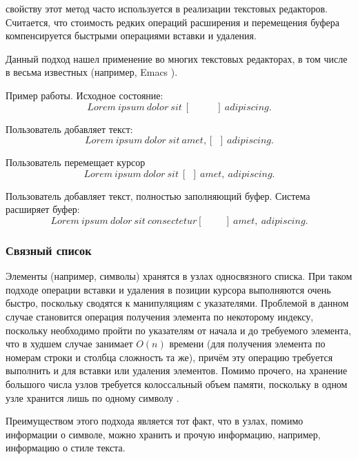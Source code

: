 \documentclass{fefu}
\begin{document}
				свойству этот метод часто используется в реализации текстовых редакторов.
				Считается, что стоимость редких операций расширения и перемещения буфера
				компенсируется быстрыми операциями вставки и удаления.
				\par Данный подход нашел применение во многих текстовых
				редакторах, в том числе в весьма известных (например, Emacs
				\cite{EmacsGapBuffer}).
				\par Пример работы. Исходное состояние:
				$$Lorem~ipsum~dolor~sit~[~~~~~~~~~~~~]~adipiscing.$$
				\par Пользователь добавляет текст:
				$$Lorem~ipsum~dolor~sit~amet,[~~]~adipiscing.$$
				\par Пользователь перемещает курсор
				$$Lorem~ipsum~dolor~sit~[~~]~amet,~adipiscing.$$
				\par Пользователь добавляет текст, полностью заполняющий буфер. Система
				расширяет буфер:
				$$Lorem~ipsum~dolor~sit~consectetur[~~~~~~~~~~]~amet,~adipiscing.$$
			\subsubsection{Связный список}
				\par Элементы (например, символы) хранятся в узлах односвязного списка. При 
				таком подходе операции вставки и удаления в позиции курсора выполняются очень 
				быстро, поскольку сводятся к манипуляциям с указателями. Проблемой в данном 
				случае становится операция получения элемента по некоторому индексу, поскольку 
				необходимо пройти по указателям от начала и до требуемого элемента, что в 
				худшем случае занимает $O(n)$ времени (для получения элемента по номерам строки
				и столбца сложность та же), причём эту операцию требуется выполнить и для 
				вставки или удаления элементов. Помимо прочего, на хранение большого числа 
				узлов требуется колоссальный объем памяти, поскольку в одном узле хранится лишь 
				по одному символу \cite{LinkedListReference}.
				\par Преимуществом этого подхода является тот факт, что в узлах, помимо
				информации о символе, можно хранить и прочую информацию, например, информацию
				о стиле текста.
\end{document}
